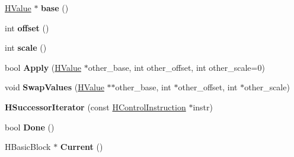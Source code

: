 \begin{DoxyCompactItemize}
\item 
\hypertarget{classv8_1_1internal_1_1_b_a_s_e___e_m_b_e_d_d_e_d_a5c599cd2cd9f8e0f8bb97deb60325eba}{}\hyperlink{classv8_1_1internal_1_1_h_value}{H\+Value} $\ast$ {\bfseries base} ()\label{classv8_1_1internal_1_1_b_a_s_e___e_m_b_e_d_d_e_d_a5c599cd2cd9f8e0f8bb97deb60325eba}

\item 
\hypertarget{classv8_1_1internal_1_1_b_a_s_e___e_m_b_e_d_d_e_d_a1460be4dc2aead25ce74b3d9b161d451}{}int {\bfseries offset} ()\label{classv8_1_1internal_1_1_b_a_s_e___e_m_b_e_d_d_e_d_a1460be4dc2aead25ce74b3d9b161d451}

\item 
\hypertarget{classv8_1_1internal_1_1_b_a_s_e___e_m_b_e_d_d_e_d_a17279970787403f65eca69d4619be0f3}{}int {\bfseries scale} ()\label{classv8_1_1internal_1_1_b_a_s_e___e_m_b_e_d_d_e_d_a17279970787403f65eca69d4619be0f3}

\item 
\hypertarget{classv8_1_1internal_1_1_b_a_s_e___e_m_b_e_d_d_e_d_a9ab51c25a1e1b182679bf5fc6a8fa685}{}bool {\bfseries Apply} (\hyperlink{classv8_1_1internal_1_1_h_value}{H\+Value} $\ast$other\+\_\+base, int other\+\_\+offset, int other\+\_\+scale=0)\label{classv8_1_1internal_1_1_b_a_s_e___e_m_b_e_d_d_e_d_a9ab51c25a1e1b182679bf5fc6a8fa685}

\item 
\hypertarget{classv8_1_1internal_1_1_b_a_s_e___e_m_b_e_d_d_e_d_ab3eb7930c69f729c66b1a42116fb2865}{}void {\bfseries Swap\+Values} (\hyperlink{classv8_1_1internal_1_1_h_value}{H\+Value} $\ast$$\ast$other\+\_\+base, int $\ast$other\+\_\+offset, int $\ast$other\+\_\+scale)\label{classv8_1_1internal_1_1_b_a_s_e___e_m_b_e_d_d_e_d_ab3eb7930c69f729c66b1a42116fb2865}

\item 
\hypertarget{classv8_1_1internal_1_1_b_a_s_e___e_m_b_e_d_d_e_d_aebe812f2300ce5010c5a783f57808821}{}{\bfseries H\+Successor\+Iterator} (const \hyperlink{classv8_1_1internal_1_1_h_control_instruction}{H\+Control\+Instruction} $\ast$instr)\label{classv8_1_1internal_1_1_b_a_s_e___e_m_b_e_d_d_e_d_aebe812f2300ce5010c5a783f57808821}

\item 
\hypertarget{classv8_1_1internal_1_1_b_a_s_e___e_m_b_e_d_d_e_d_a7f0cde988076e056138a7a4b88b73023}{}bool {\bfseries Done} ()\label{classv8_1_1internal_1_1_b_a_s_e___e_m_b_e_d_d_e_d_a7f0cde988076e056138a7a4b88b73023}

\item 
\hypertarget{classv8_1_1internal_1_1_b_a_s_e___e_m_b_e_d_d_e_d_a188d7ec2be395babd2071b5414028a83}{}H\+Basic\+Block $\ast$ {\bfseries Current} ()\label{classv8_1_1internal_1_1_b_a_s_e___e_m_b_e_d_d_e_d_a188d7ec2be395babd2071b5414028a83}


\end{DoxyCompactItemize}
